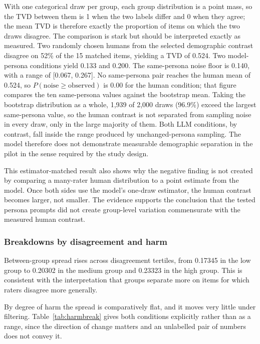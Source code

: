 \documentclass[11pt,a4paper]{article}
\begin{document}
With one categorical draw per group, each group distribution is a point mass, so the TVD between
them is 1 when the two labels differ and 0 when they agree; the mean TVD is therefore exactly the
proportion of items on which the two draws disagree. The comparison is stark but should be
interpreted exactly as measured. Two randomly chosen humans from the selected demographic
contrast disagree on 52\% of the 15 matched items, yielding a TVD of 0.524. Two model-persona conditions yield 0.133 and 0.200. The same-persona noise floor is
0.140, with a range of [0.067, 0.267]. No same-persona pair reaches the human mean of 0.524,
so $P(\text{noise} \geq \text{observed})$ is 0.00 for the human condition; that figure compares
the ten same-persona values against the bootstrap mean. Taking the bootstrap distribution as a
whole, 1,939 of 2,000 draws (96.9\%) exceed the largest same-persona value, so the human
contrast is not separated from sampling noise in every draw, only in the large majority of them.
Both LLM conditions, by contrast, fall inside the range produced by unchanged-persona sampling. The model therefore does not demonstrate measurable demographic
separation in the pilot in the sense required by the study design.

This estimator-matched result also shows why the negative finding is not created by comparing a
many-rater human distribution to a point estimate from the model. Once both sides use the model's
one-draw estimator, the human contrast becomes larger, not smaller. The evidence supports the
conclusion that the tested persona prompts did not create group-level variation commensurate with
the measured human contrast.

\subsubsection{Breakdowns by disagreement and harm}

Between-group spread rises across disagreement tertiles, from 0.17345 in the low group to 0.20302
in the medium group and 0.23323 in the high group. This is consistent with the interpretation
that groups separate more on items for which raters disagree more generally.

By degree of harm the spread is comparatively flat, and it moves very little under filtering.
Table~\ref{tab:harmbreak} gives both conditions explicitly rather than as a range, since the
direction of change matters and an unlabelled pair of numbers does not convey it.
\end{document}
